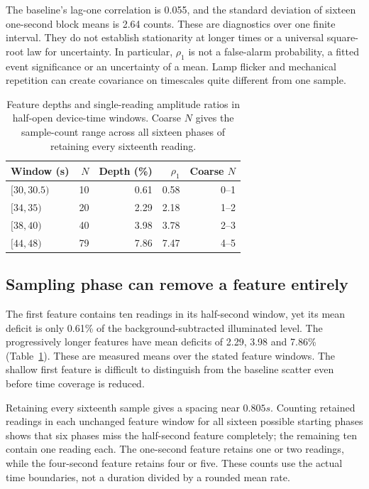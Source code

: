 The baseline's lag-one correlation is 0.055, and the standard deviation of sixteen one-second block means is 2.64 counts. These are diagnostics over one finite interval. They do not establish stationarity at longer times or a universal square-root law for uncertainty. In particular, $\rho_1$ is not a false-alarm probability, a fitted event significance or an uncertainty of a mean. Lamp flicker and mechanical repetition can create covariance on timescales quite different from one sample\cite{pont2006}.

\begin{table}[t]
\caption{Feature depths and single-reading amplitude ratios in half-open device-time windows. Coarse $N$ gives the sample-count range across all sixteen phases of retaining every sixteenth reading.}
\label{tab:trc-sampling}
\centering\footnotesize\setlength{\tabcolsep}{3.5pt}
\begin{tabular}{@{}lrrrr@{}}\toprule
Window (s)&$N$&Depth (\%)&$\rho_1$&Coarse $N$\\\midrule
$[30,30.5)$&10&0.61&0.58&0--1\\
$[34,35)$&20&2.29&2.18&1--2\\
$[38,40)$&40&3.98&3.78&2--3\\
$[44,48)$&79&7.86&7.47&4--5\\\bottomrule
\end{tabular}
\end{table}

\subsection{Sampling phase can remove a feature entirely}
The first feature contains ten readings in its half-second window, yet its mean deficit is only 0.61\% of the background-subtracted illuminated level. The progressively longer features have mean deficits of 2.29, 3.98 and 7.86\% (Table~\ref{tab:trc-sampling}). These are measured means over the stated feature windows. The shallow first feature is difficult to distinguish from the baseline scatter even before time coverage is reduced.

Retaining every sixteenth sample gives a spacing near $0.805\unit{s}$. Counting retained readings in each unchanged feature window for all sixteen possible starting phases shows that six phases miss the half-second feature completely; the remaining ten contain one reading each. The one-second feature retains one or two readings, while the four-second feature retains four or five. These counts use the actual time boundaries, not a duration divided by a rounded mean rate.

